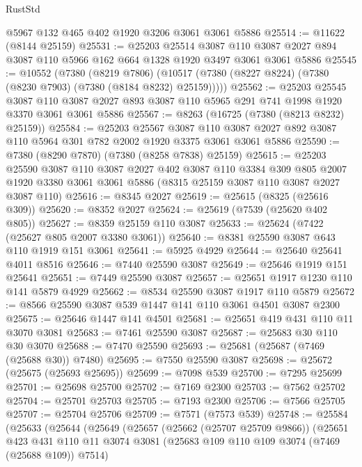 \begin{lexlean}{RustStd}
\begin{coremodule}
    @5967
    @132
    @465
    @402
    @1920
    @3206
    @3061
    @3061
    @5886
@25514 := @11622 (@8144 @25159)
@25531 := @25203
    @25514
    @3087
    @110
    @3087
    @2027
    @894
    @3087
    @110
    @5966
    @162
    @664
    @1328
    @1920
    @3497
    @3061
    @3061
    @5886
@25545 := @10552
    (@7380
      (@8219 @7806)
      (@10517 (@7380 (@8227 @8224) (@7380 (@8230 @7903) (@7380 (@8184 @8232) @25159)))))
@25562 := @25203
    @25545
    @3087
    @110
    @3087
    @2027
    @893
    @3087
    @110
    @5965
    @291
    @741
    @1998
    @1920
    @3370
    @3061
    @3061
    @5886
@25567 := @8263 (@16725 (@7380 (@8213 @8232) @25159))
@25584 := @25203
    @25567
    @3087
    @110
    @3087
    @2027
    @892
    @3087
    @110
    @5964
    @301
    @782
    @2002
    @1920
    @3375
    @3061
    @3061
    @5886
@25590 := @7380 (@8290 @7870) (@7380 (@8258 @7838) @25159)
@25615 := @25203
    @25590
    @3087
    @110
    @3087
    @2027
    @402
    @3087
    @110
    @3384
    @309
    @805
    @2007
    @1920
    @3380
    @3061
    @3061
    @5886
    (@8315 @25159 @3087 @110 @3087 @2027 @3087 @110)
@25616 := @8345 @2027
@25619 := @25615 (@8325 (@25616 @309))
@25620 := @8352 @2027
@25624 := @25619 (@7539 (@25620 @402 @805))
@25627 := @8359 @25159 @110 @3087
@25633 := @25624 (@7422 (@25627 @805 @2007 @3380 @3061))
@25640 := @8381 @25590 @3087 @643 @110 @1919 @151 @3061
@25641 := @5925 @4929
@25644 := @25640 @25641 @4011 @8516
@25646 := @7440 @25590 @3087
@25649 := @25646 @1919 @151 @25641
@25651 := @7449 @25590 @3087
@25657 := @25651 @1917 @1230 @110 @141 @5879 @4929
@25662 := @8534 @25590 @3087 @1917 @110 @5879
@25672 := @8566 @25590 @3087 @539 @1447 @141 @110 @3061 @4501 @3087 @2300
@25675 := @25646 @1447 @141 @4501
@25681 := @25651 @419 @431 @110 @11 @3070 @3081
@25683 := @7461 @25590 @3087
@25687 := @25683 @30 @110 @30 @3070
@25688 := @7470 @25590
@25693 := @25681 (@25687 (@7469 (@25688 @30)) @7480)
@25695 := @7550 @25590 @3087
@25698 := @25672 (@25675 (@25693 @25695))
@25699 := @7098 @539
@25700 := @7295 @25699
@25701 := @25698 @25700
@25702 := @7169 @2300
@25703 := @7562 @25702
@25704 := @25701 @25703
@25705 := @7193 @2300
@25706 := @7566 @25705
@25707 := @25704 @25706
@25709 := @7571 (@7573 @539)
@25748 := @25584
    (@25633
      (@25644
        (@25649
          (@25657
            (@25662 (@25707 @25709 @9866))
            (@25651
              @423
              @431
              @110
              @11
              @3074
              @3081
              (@25683 @109 @110 @109 @3074 (@7469 (@25688 @109)) @7514)

\end{coremodule}
\end{lexlean}
